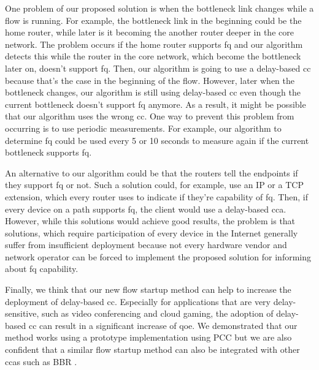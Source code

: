 \documentclass[runningheads]{llncs}
\begin{document}
One problem of our proposed solution is when the bottleneck link changes while a flow is running. For example, the bottleneck link in the beginning could be the home router, while later is it becoming the another router deeper in the core network. The problem occurs if the home router supports \gls{fq} and our algorithm detects this while the router in the core network, which become the bottleneck later on, doesn't support \gls{fq}. Then, our algorithm is going to use a delay-based \gls{cc} because that's the case in the beginning of the flow. However, later when the bottleneck changes, our algorithm is still using delay-based \gls{cc} even though the current bottleneck doesn't support \gls{fq} anymore. As a result, it might be possible that our algorithm uses the wrong \gls{cc}. One way to prevent this problem from occurring is to use periodic measurements. For example, our algorithm to determine \gls{fq} could be used every 5 or 10 seconds to measure again if the current bottleneck supports \gls{fq}. 

An alternative to our algorithm could be that the routers tell the endpoints if they support \gls{fq} or not. Such a solution could, for example, use an IP or a TCP extension, which every router uses to indicate if they're capability of \gls{fq}. Then, if every device on a path supports \gls{fq}, the client would use a delay-based \gls{cca}. However, while this solutions would achieve good results, the problem is that solutions, which require participation of every device in the Internet generally suffer from insufficient deployment because not every hardware vendor and network operator can be forced to implement the proposed solution for informing about \gls{fq} capability. 

Finally, we think that our new flow startup method can help to increase the deployment of delay-based \gls{cc}. Especially for applications that are very delay-sensitive, such as video conferencing and cloud gaming, the adoption of delay-based \gls{cc} can result in a significant increase of \gls{qoe}. We demonstrated that our method works using a prototype implementation using PCC but we are also confident that a similar flow startup method can also be integrated with other \glspl{cca} such as BBR \cite{cardwell_bbr:_2016}. 



\end{document}
